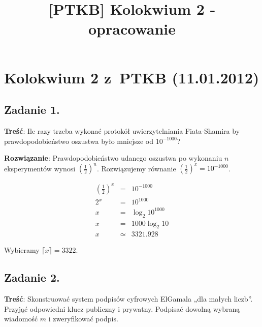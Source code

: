 \documentclass[a4paper,10pt, twocolumn]{article}
\title{[PTKB] Kolokwium 2 - opracowanie}
\author{}
\date{}
\begin{document}
\maketitle

\section{Kolokwium 2 z~PTKB (11.01.2012)}

\subsection{Zadanie 1.}
\label{subsec:KolZadanie1}

\textbf{Treść}: Ile razy trzeba wykonać protokół uwierzytelniania Fiata-Shamira by prawdopodobieństwo oszustwa było mniejsze od $10^{-1000}$?

\textbf{Rozwiązanie}: Prawdopodobieństwo udanego oszustwa po wykonaniu $n$ eksperymentów wynosi $(\frac{1}{2})^{n}$. Rozwiązujemy równanie $(\frac{1}{2})^{x} = 10^{-1000}$.

\begin{equation*}
	\begin{array}{lcl} (\frac{1}{2})^{x} & = & 10^{-1000} \\ 2^{x} & = & 10^{1000} \\ x & = & \log_{2} 10^{1000} \\ x & = & 1000 \log_{2} 10 \\ x & \simeq & 3321.928 \end{array}
\end{equation*}

Wybieramy $\lceil x \rceil = 3322$.

\subsection{Zadanie 2.}

\textbf{Treść}: Skonstruować system podpisów cyfrowych ElGamala „dla małych liczb”. Przyjąć odpowiedni klucz publiczny i prywatny. Podpisać dowolną wybraną wiadomość $m$ i zweryfikować podpis.
\end{document}
